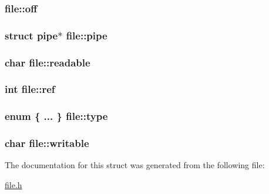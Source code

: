 \subsubsection[{\texorpdfstring{off}{off}}]{ file\+::off}\hypertarget{structfile_a94a911be6cc1b1326728392d8b40150d}{}\label{structfile_a94a911be6cc1b1326728392d8b40150d}
\subsubsection[{\texorpdfstring{pipe}{pipe}}]{\setlength{\rightskip}{0pt plus 5cm}struct {\bf pipe}$\ast$ file\+::pipe}\hypertarget{structfile_a19d83a8d6cb47902fe8c762d2798c198}{}\label{structfile_a19d83a8d6cb47902fe8c762d2798c198}
\subsubsection[{\texorpdfstring{readable}{readable}}]{\setlength{\rightskip}{0pt plus 5cm}char file\+::readable}\hypertarget{structfile_a0c5c8eced8bc562dbbecc8d450a6b646}{}\label{structfile_a0c5c8eced8bc562dbbecc8d450a6b646}
\subsubsection[{\texorpdfstring{ref}{ref}}]{\setlength{\rightskip}{0pt plus 5cm}int file\+::ref}\hypertarget{structfile_a41c818f828adea488058bca63e4df23f}{}\label{structfile_a41c818f828adea488058bca63e4df23f}
\subsubsection[{\texorpdfstring{type}{type}}]{\setlength{\rightskip}{0pt plus 5cm}enum \{ ... \}   file\+::type}\hypertarget{structfile_aeb945bc9619708cd2d5f7ae28faf922a}{}\label{structfile_aeb945bc9619708cd2d5f7ae28faf922a}
\subsubsection[{\texorpdfstring{writable}{writable}}]{\setlength{\rightskip}{0pt plus 5cm}char file\+::writable}\hypertarget{structfile_a6e1b641ea1551ac4316a0c11a683df45}{}\label{structfile_a6e1b641ea1551ac4316a0c11a683df45}


The documentation for this struct was generated from the following file\+:\begin{DoxyCompactItemize}
\item 
\hyperlink{file_8h}{file.\+h}\end{DoxyCompactItemize}
